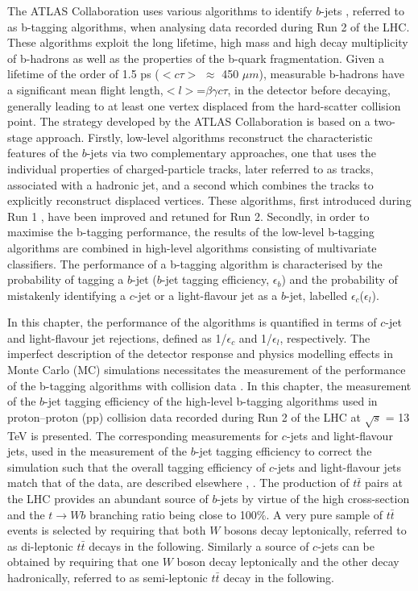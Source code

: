 \documentclass[letterpaper,12pt]{article}
\begin{document}
The ATLAS Collaboration uses various algorithms to identify 
$b$-jets \cite{PERF-2012-04}, referred to as b-tagging algorithms, 
when analysing data recorded during Run 2 of the LHC. These 
algorithms exploit the long lifetime, high mass and high decay 
multiplicity of b-hadrons as well as the properties of the b-quark 
fragmentation. Given a lifetime of the order of 1.5 ps 
($<c\tau>$ $\approx$ 450 $\mu m$), measurable b-hadrons have a 
significant mean flight length,$<l>$=$\beta\gamma c\tau$, in the 
detector before decaying, generally leading to at least one vertex 
displaced from the hard-scatter collision point. The strategy 
developed by the ATLAS Collaboration is based on a two-stage approach. 
Firstly, low-level algorithms reconstruct the characteristic features of 
the $b$-jets via two complementary approaches, one that uses the 
individual properties of charged-particle tracks, later referred 
to as tracks, associated with a hadronic jet, and a second which 
combines the tracks to explicitly reconstruct displaced vertices. 
These algorithms, first introduced during Run 1 \cite{PERF-2012-04}, 
have been improved and retuned for Run 2. Secondly, in order to 
maximise the b-tagging performance, the results of the low-level 
b-tagging algorithms are combined in high-level algorithms 
consisting of multivariate classifiers. The performance of a 
b-tagging algorithm is characterised by the probability of 
tagging a $b$-jet ($b$-jet tagging efficiency, $\epsilon_b$) and 
the probability of mistakenly identifying a $c$-jet or a light-flavour 
jet as a $b$-jet, labelled $\epsilon_c$($\epsilon_l$). 

In this chapter, the performance of the algorithms is quantified 
in terms of $c$-jet and light-flavour jet rejections, defined as 
1/$\epsilon_c$ and 1/$\epsilon_l$, respectively. The imperfect 
description of the detector response and physics modelling effects 
in Monte Carlo (MC) simulations necessitates the measurement of the 
performance of the b-tagging algorithms with collision data 
\cite{PERF-2012-04 ttbar,b-jet identification semi ttbar}. 
In this chapter, the measurement of the $b$-jet tagging efficiency 
of the high-level b-tagging algorithms used in proton–proton (pp) 
collision data recorded during Run 2 of the LHC at $\sqrt{s}$ = 13 TeV 
is presented. The corresponding measurements for $c$-jets and light-flavour 
jets, used in the measurement of the $b$-jet tagging efficiency to correct 
the simulation such that the overall tagging efficiency of $c$-jets and 
light-flavour jets match that of the data, are described elsewhere 
\cite{ATLAS-CONF-2018-006}, \cite{cjet}. The production of $t\bar{t}$ 
pairs at the LHC provides an abundant source of $b$-jets by virtue 
of the high cross-section and the $t \rightarrow Wb$ branching ratio 
being close to 100\%. A very pure sample of $t\bar{t}$ events is 
selected by requiring that both $W$ bosons decay leptonically, 
referred to as di-leptonic $t\bar{t}$ decays in the following. 
Similarly a source of $c$-jets can be obtained by requiring that 
one $W$ boson decay leptonically and the other decay hadronically, 
referred to as semi-leptonic $t\bar{t}$ decay in the following. 
\end{document}
